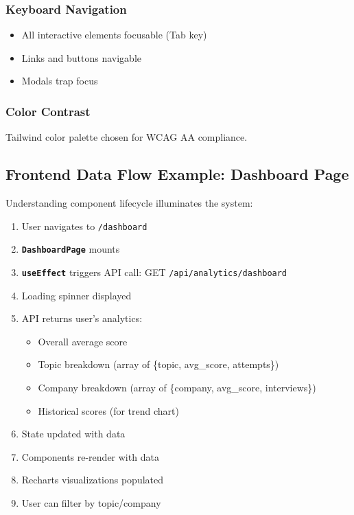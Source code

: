 \documentclass[12pt,a4paper,oneside]{article}
\newcommand{\funcname}[1]{\texttt{\textbf{#1}}}
\newcommand{\classname}[1]{\texttt{\textbf{#1}}}
\begin{document}
\subsubsection{Keyboard Navigation}

\begin{itemize}
    \item All interactive elements focusable (Tab key)
    \item Links and buttons navigable
    \item Modals trap focus
\end{itemize}

\subsubsection{Color Contrast}

Tailwind color palette chosen for WCAG AA compliance.

\subsection{Frontend Data Flow Example: Dashboard Page}

Understanding component lifecycle illuminates the system:

\begin{enumerate}
    \item User navigates to \texttt{/dashboard}
    \item \classname{DashboardPage} mounts
    \item \funcname{useEffect} triggers API call: GET \texttt{/api/analytics/dashboard}
    \item Loading spinner displayed
    \item API returns user's analytics:
    \begin{itemize}
        \item Overall average score
        \item Topic breakdown (array of \{topic, avg\_score, attempts\})
        \item Company breakdown (array of \{company, avg\_score, interviews\})
        \item Historical scores (for trend chart)
    \end{itemize}
    \item State updated with data
    \item Components re-render with data
    \item Recharts visualizations populated
    \item User can filter by topic/company
\end{enumerate}
\end{document}

